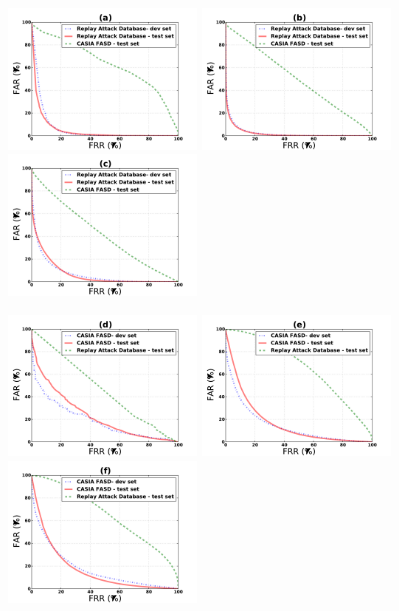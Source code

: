 \begin{figure}[ht]
\begin{center}
\includegraphics [width=5cm] {plots/CROSS-DATABASE/MOTION/roc_replay-machine.pdf} 
\includegraphics [width=5cm] {plots/CROSS-DATABASE/LBPTOP/roc_replay-machine.pdf}
\includegraphics [width=5cm] {plots/CROSS-DATABASE/LBP/roc_replay-machine.pdf}

\includegraphics [width=5cm] {plots/CROSS-DATABASE/MOTION/roc_casia_fasd-machine.pdf} 
\includegraphics [width=5cm] {plots/CROSS-DATABASE/LBPTOP/roc_casia_fasd-machine.pdf}
\includegraphics [width=5cm] {plots/CROSS-DATABASE/LBP/roc_casia_fasd-machine.pdf}


\end{center}
\end{figure}
